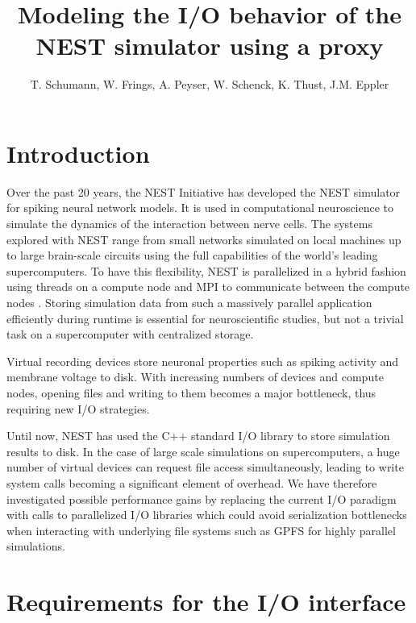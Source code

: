 \documentclass[]{YIC2015}
\title{Modeling the I/O behavior of the NEST simulator using a proxy}
\author[T. Schumann et al.]{%
  T. Schumann\authref{a}\corref,
  W. Frings\authref{b},
  A. Peyser\authref{c},
  W. Schenck\authref{c},
  K. Thust\authref{b},
  J.M. Eppler\authref{c}
}
\begin{document}
\maketitle

\section{Introduction}
%
Over the past 20 years, the NEST Initiative \cite{NESTInitiative} has
developed the NEST \cite{NEST} simulator for spiking neural network
models. It is used in computational neuroscience to simulate the
dynamics of the interaction between nerve cells. The systems explored
with NEST range from small networks simulated on local machines up to
large brain-scale circuits using the full capabilities of the world's
leading supercomputers. To have this flexibility, NEST is parallelized
in a hybrid fashion using threads on a compute node and MPI to
communicate between the compute nodes \cite{Plesser07}.  Storing
simulation data from such a massively parallel application efficiently
during runtime is essential for neuroscientific studies, but not a
trivial task on a supercomputer with centralized storage.

Virtual recording devices store neuronal properties such as spiking
activity and membrane voltage to disk. With increasing numbers of
devices and compute nodes, opening files and writing to them becomes a
major bottleneck, thus requiring new I/O strategies.

Until now, NEST has used the C++ standard I/O library to store
simulation results to disk. In the case of large scale simulations on
supercomputers, a huge number of virtual devices can request file
access simultaneously, leading to write system calls becoming a
significant element of overhead. We have therefore investigated
possible performance gains by replacing the current I/O paradigm with
calls to parallelized I/O libraries which could avoid serialization
bottlenecks when interacting with underlying file systems such as GPFS
\cite{GPFS} for highly parallel simulations.

\section{Requirements for the I/O interface}
\end{document}
